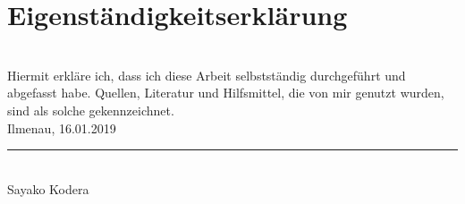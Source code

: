 \chapter*{Eigenständigkeitserklärung}

\\[4cm] %
Hiermit erkläre ich, dass ich diese Arbeit selbstständig durchgeführt und abgefasst habe.
Quellen, Literatur und Hilfsmittel, die von mir genutzt wurden, sind als solche
gekennzeichnet.\\[2cm]

Ilmenau, 16.01.2019  \hfill
\begin{minipage}[t]{7cm}\centering
    \rule{\linewidth}{.5pt}\\
    Sayako Kodera
\end{minipage}